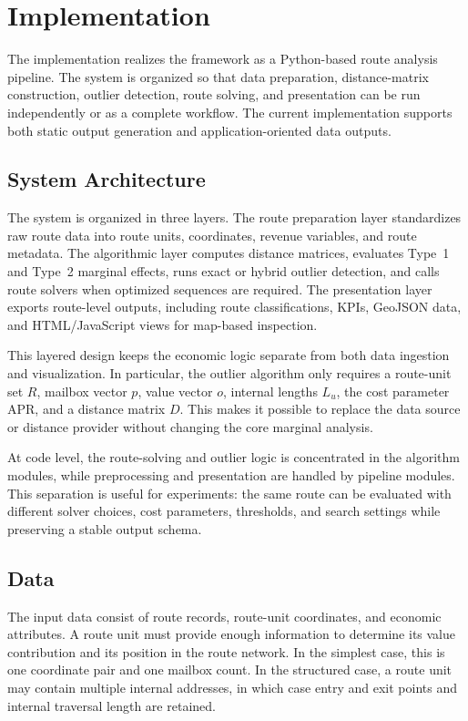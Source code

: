 \documentclass[preprint,12pt]{elsarticle}
\begin{document}
\section{Implementation}
\label{sec:implementation}

The implementation realizes the framework as a Python-based route analysis pipeline. The system is organized so that data preparation, distance-matrix construction, outlier detection, route solving, and presentation can be run independently or as a complete workflow. The current implementation supports both static output generation and application-oriented data outputs.

\subsection{System Architecture}
\label{subsec:system-architecture}

The system is organized in three layers. The route preparation layer standardizes raw route data into route units, coordinates, revenue variables, and route metadata. The algorithmic layer computes distance matrices, evaluates Type~1 and Type~2 marginal effects, runs exact or hybrid outlier detection, and calls route solvers when optimized sequences are required. The presentation layer exports route-level outputs, including route classifications, KPIs, GeoJSON data, and HTML/JavaScript views for map-based inspection.

This layered design keeps the economic logic separate from both data ingestion and visualization. In particular, the outlier algorithm only requires a route-unit set $R$, mailbox vector $p$, value vector $o$, internal lengths $L_u$, the cost parameter $\mathrm{APR}$, and a distance matrix $D$. This makes it possible to replace the data source or distance provider without changing the core marginal analysis.

At code level, the route-solving and outlier logic is concentrated in the algorithm modules, while preprocessing and presentation are handled by pipeline modules. This separation is useful for experiments: the same route can be evaluated with different solver choices, cost parameters, thresholds, and search settings while preserving a stable output schema.

\subsection{Data}
\label{subsec:data}

The input data consist of route records, route-unit coordinates, and economic attributes. A route unit must provide enough information to determine its value contribution and its position in the route network. In the simplest case, this is one coordinate pair and one mailbox count. In the structured case, a route unit may contain multiple internal addresses, in which case entry and exit points and internal traversal length are retained.
\end{document}
